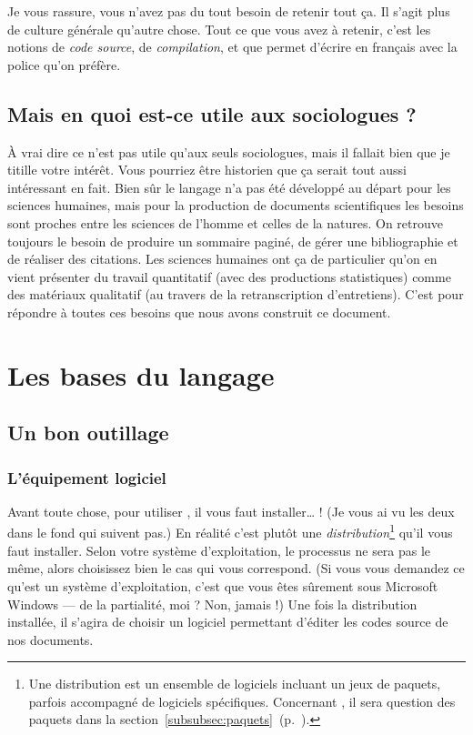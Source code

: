 \documentclass[notitlepage,onecolumn,twoside,12pt,final]{article}
\begin{document}
			\bigskip
			
			Je vous rassure, vous n'avez pas du tout besoin de retenir tout ça. Il s'agit plus de culture générale qu'autre chose. Tout ce que vous avez à retenir, c'est les notions de \emph{code source}, de \emph{compilation}, et que \XeLaTeX{} permet d'écrire en français avec la police qu'on préfère.
			
		\subsection{Mais en quoi est-ce utile aux sociologues ?}
			À vrai dire ce n'est pas utile qu'aux seuls sociologues, mais il fallait bien que je titille votre intérêt. Vous pourriez être historien que ça serait tout aussi intéressant en fait. Bien sûr le langage n'a pas été développé au départ pour les sciences humaines, mais pour la production de documents scientifiques les besoins sont proches entre les sciences de l'homme et celles de la natures. On retrouve toujours le besoin de produire un sommaire paginé, de gérer une bibliographie et de réaliser des citations. Les sciences humaines ont ça de particulier qu'on en vient présenter du travail quantitatif (avec des productions statistiques) comme des matériaux qualitatif (au travers de la retranscription d'entretiens). C'est pour répondre à toutes ces besoins que nous avons construit ce document.
		
	\section{Les bases du langage}
		\subsection{Un bon outillage}
			\subsubsection{L'équipement logiciel}
				Avant toute chose, pour utiliser \XeLaTeX{}, il vous faut installer\ldots{} \XeLaTeX ! (Je vous ai vu les deux dans le fond qui suivent pas.) En réalité c'est plutôt une \emph{distribution}\footnote{Une distribution est un ensemble de logiciels incluant un jeux de paquets, parfois accompagné de logiciels spécifiques. Concernant \XeLaTeX, il sera question des paquets dans la section~\ref{subsubsec:paquets}~(p.~\pageref{subsubsec:paquets}).} qu'il vous faut installer. Selon votre système d'exploitation, le processus ne sera pas le même, alors choisissez bien le cas qui vous correspond. (Si vous vous demandez ce qu'est un système d'exploitation, c'est que vous êtes sûrement sous Microsoft Windows --- de la partialité, moi ? Non, jamais !) Une fois la distribution installée, il s'agira de choisir un logiciel permettant d'éditer les codes source de nos documents.
				
\end{document}
